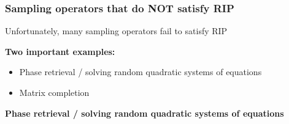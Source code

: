 \documentclass[compress,
mathserif,wide,%
]{beamer}
\begin{document}
\begin{frame}
\frametitle{Sampling operators that do NOT satisfy RIP} 


{

\begin{varblock}[\textwidth]{}
   \begin{center}
     Unfortunately, many sampling operators fail to satisfy RIP 
   \end{center}
\end{varblock}
}

\vfill

{\bf Two important examples:}
\bigskip

\begin{itemize}
  \itemsep1em
  \item Phase retrieval / solving random quadratic systems of equations
  \item Matrix completion
\end{itemize}


\end{frame}


\begin{frame}

\vfill


\begin{center}
  {\Large\bf Phase retrieval / solving random quadratic systems of equations}
\end{center}
\vfill

\end{frame}
\end{document}
